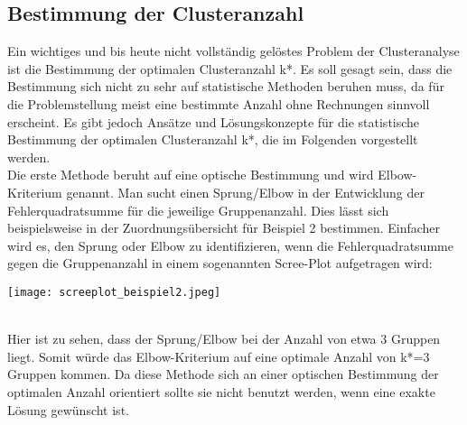 \documentclass[12pt,titlepage]{article}
\begin{document}
		\subsection{Bestimmung der Clusteranzahl}
			Ein wichtiges und bis heute nicht vollständig gelöstes Problem der Clusteranalyse ist die Bestimmung der optimalen Clusteranzahl k*. Es soll gesagt sein, dass die Bestimmung sich nicht zu sehr auf statistische Methoden beruhen muss, da für die Problemstellung meist eine bestimmte Anzahl ohne Rechnungen sinnvoll erscheint. Es gibt jedoch Ansätze und Lösungskonzepte für die statistische Bestimmung der optimalen Clusteranzahl k*, die im Folgenden vorgestellt werden. \\
Die erste Methode beruht auf eine optische Bestimmung und wird Elbow-Kriterium \cite[S. 495 f.]{Backhaus2015} genannt. Man sucht einen Sprung/Elbow in der Entwicklung der Fehlerquadratsumme für die jeweilige Gruppenanzahl. Dies lässt sich beispielsweise in der Zuordnungsübersicht für Beispiel 2 bestimmen. Einfacher wird es, den Sprung oder Elbow zu identifizieren, wenn die Fehlerquadratsumme gegen die Gruppenanzahl in einem sogenannten Scree-Plot aufgetragen wird: \\
\centerline{{\texttt{[image: screeplot\_beispiel2.jpeg]}}} \\
Hier ist zu sehen, dass der Sprung/Elbow bei der Anzahl von etwa 3 Gruppen liegt. Somit würde das Elbow-Kriterium auf eine optimale Anzahl von k*=3 Gruppen kommen. Da diese Methode sich an einer optischen Bestimmung der optimalen Anzahl orientiert sollte sie nicht benutzt werden, wenn eine exakte Lösung gewünscht ist.\\
\end{document}
